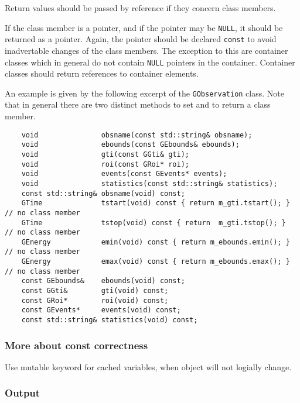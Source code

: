 \documentclass{article}[12pt,a4]
\begin{document}
Return values should be passed by reference if they concern class members.

If the class member is a pointer, and if the pointer may be {\tt NULL}, it should be
returned as a pointer.
Again, the pointer should be declared {\tt const} to avoid inadvertable changes of
the class members.
The exception to this are container classes which in general do not contain
{\tt NULL} pointers in the container.
Container classes should return references to container elements.

An example is given by the following excerpt of the {\tt GObservation} class.
Note that in general there are two distinct methods to set and to return a
class member.
\begin{verbatim}
    void               obsname(const std::string& obsname);
    void               ebounds(const GEbounds& ebounds);
    void               gti(const GGti& gti);
    void               roi(const GRoi* roi);
    void               events(const GEvents* events);
    void               statistics(const std::string& statistics);
    const std::string& obsname(void) const;
    GTime              tstart(void) const { return m_gti.tstart(); }  // no class member
    GTime              tstop(void) const { return  m_gti.tstop(); }   // no class member
    GEnergy            emin(void) const { return m_ebounds.emin(); }  // no class member
    GEnergy            emax(void) const { return m_ebounds.emax(); }  // no class member
    const GEbounds&    ebounds(void) const;
    const GGti&        gti(void) const;
    const GRoi*        roi(void) const;
    const GEvents*     events(void) const;
    const std::string& statistics(void) const;
\end{verbatim}


\subsubsection{More about const correctness}

Use mutable keyword for cached variables, when object will not logially change.


\subsubsection{Output}
\label{sec:output}
\end{document}
